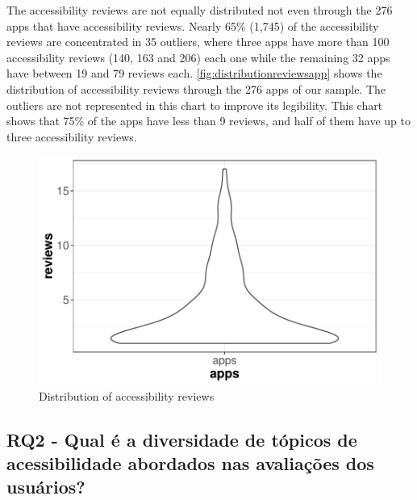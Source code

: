 The accessibility reviews are not equally distributed not even through the 276 apps that have accessibility reviews. 
Nearly 65\% (1,745) of the accessibility reviews are concentrated in 35 outliers,
where three apps have more than 100 accessibility reviews (140, 163 and 206) each one while the remaining 32 apps have between 19 and 79 reviews each. 
\autoref{fig:distributionreviewsapp} shows the distribution of accessibility reviews through the 276 apps of our sample. 
The outliers are not represented in this chart to improve its legibility. 
This chart shows that 75\% of the apps have less than 9 reviews, and half of them have up to three accessibility reviews.


\begin{figure}[!htb]
\centering
\includegraphics[scale=0.80]{imagens/distribution-accreviews-no-outlier-violin.pdf}
\caption{Distribution of accessibility reviews}
\label{fig:distributionreviewsapp}
\end{figure}


\subsection{RQ2 - Qual é a diversidade de tópicos de acessibilidade abordados nas avaliações dos usuários?}


